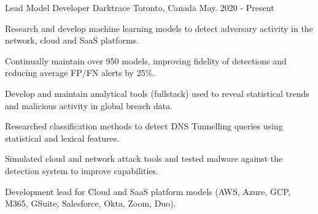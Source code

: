 

\begin{cventries}

  \cventry
    {Lead Model Developer} %
    {Darktrace} %
    {Toronto, Canada} %
    {May. 2020 - Present} %
    {
      \begin{cvitems} %
        \item {Research and develop machine learning models to detect adversary activity in the network, cloud and SaaS platforms.}
        \item {Continually maintain over 950 models, improving fidelity of detections and reducing average FP/FN alerts by 25\%.}
        \item {Develop and maintain analytical tools (fullstack) used to reveal statistical trends and malicious activity in global breach data.}
        \item {Researched classification methods to detect DNS Tunnelling queries using statistical and lexical features.}
        \item {Simulated cloud and network attack tools and tested malware against the detection system to improve capabilities.}
        \item {Development lead for Cloud and SaaS platform models (AWS, Azure, GCP, M365, GSuite, Salesforce, Okta, Zoom, Duo).}
      \end{cvitems}
    }


\end{cventries}
